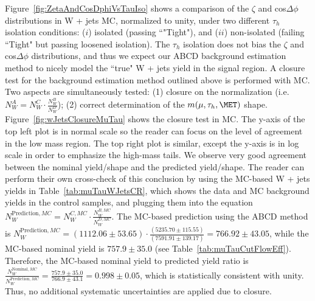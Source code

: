 Figure~\ref{fig:ZetaAndCosDphiVsTauIso} shows a comparison of the $\zeta$ and cos$\Delta\phi$ distributions in W + jets MC, normalized to unity, under two 
different $\tau_{h}$ isolation conditions: ($i$) isolated (passing ``"Tight"), and ($ii$) non-isolated (failing ``Tight" but passing loosened isolation). The 
$\tau_{h}$ isolation does not bias the $\zeta$ and cos$\Delta\phi$ distributions, and thus we expect our ABCD background estimation method to nicely model the ``true" W + 
jets yield in the signal region. A closure test for the background estimation method outlined above is performed with MC. Two aspects are simultaneously tested: 
(1) closure on the normalization (i.e. $N_{W}^{A} = N_{W}^{C} \cdot \frac{N_{W}^{B}}{N_{W}^{D}}$); (2) correct determination of the $m(\mu,\tau_{h},\MET)$ shape. 
Figure~\ref{fig:wJetsClosureMuTau} shows the closure test in MC. The y-axis of the top left plot is in normal scale so the reader can focus on the level of 
agreement in the low mass region. The top right plot is similar, except the y-axis is in log scale in order to emphasize the high-mass tails. We observe very 
good agreement between the nominal yield/shape and the predicted yield/shape. The reader can perform their own cross-check of this conclusion by using the 
MC-based W + jets yields in Table~\ref{tab:muTauWJetsCR}, which shows the data and MC background yields in the control samples, and plugging them into the 
equation $N_{W}^{\textrm{Prediction},MC} = N_{W}^{C,MC} \cdot \frac{N_{W}^{B,MC}}{N_{W}^{D,MC}}$. The MC-based prediction using the ABCD method is 
$N_{W}^{\textrm{Prediction},MC} = (1112.06 \pm 53.65) \cdot \frac{(5235.70 \pm 115.55)}{(7591.91 \pm 139.17)} = 766.92 \pm 43.05$, while the MC-based nominal 
yield is $757.9 \pm 35.0$ (see Table~\ref{tab:muTauCutFlowEff}). Therefore, the MC-based nominal yield to predicted yield ratio is 
$\frac{N_{W}^{\textrm{Nominal},MC}}{N_{W}^{\textrm{Prediction},MC}} = \frac{757.9 \pm 35.0}{766.9 \pm 43.1} = 0.998 \pm 0.05$, which is statistically 
consistent with unity. 
Thus, no additional systematic uncertainties are applied due to closure.

